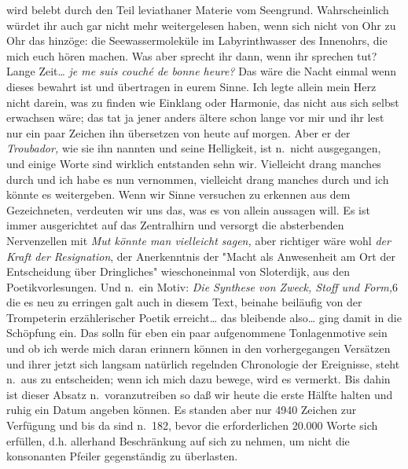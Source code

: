 \documentclass[
]{article}
\begin{document}
wird belebt durch den Teil leviathaner Materie vom Seengrund.
Wahrscheinlich würdet ihr auch gar nicht mehr weitergelesen haben, wenn
sich nicht von Ohr zu Ohr das hinzöge: die Seewassermoleküle im
Labyrinthwasser des Innenohrs, die mich euch hören machen. Was aber
sprecht ihr dann, wenn ihr sprechen tut? Lange Zeit\ldots{} \emph{je me
suis couché de bonne heure?} Das wäre die Nacht einmal wenn dieses
bewahrt ist und übertragen in eurem Sinne. Ich legte allein mein Herz
nicht darein, was zu finden wie Einklang oder Harmonie, das nicht aus
sich selbst erwachsen wäre; das tat ja jener anders ältere schon lange
vor mir und ihr lest nur ein paar Zeichen ihn übersetzen von heute auf
morgen. Aber er der \emph{Troubador, }wie sie ihn nannten und seine
Helligkeit, ist n.~nicht ausgegangen, und einige Worte sind wirklich
entstanden sehn wir. Vielleicht drang manches durch und ich habe es nun
vernommen, vielleicht drang manches durch und ich könnte es weitergeben.
Wenn wir Sinne versuchen zu erkennen aus dem Gezeichneten, verdeuten wir
uns das, was es von allein aussagen will. Es ist immer ausgerichtet auf
das Zentralhirn und versorgt die absterbenden Nervenzellen mit \emph{Mut
könnte man vielleicht sagen,} aber richtiger wäre wohl \emph{der Kraft
der Resignation}, der Anerkenntnis der "Macht als Anwesenheit am Ort der
Entscheidung über Dringliches" wieschoneinmal von Sloterdijk, aus den
Poetikvorlesungen. Und n.~ein Motiv: \emph{Die Synthese von Zweck, Stoff
und Form,}6 die es neu zu erringen galt auch in diesem Text, beinahe
beiläufig von der Trompeterin erzählerischer Poetik erreicht\ldots{} das
bleibende also\ldots{} ging damit in die Schöpfung ein. Das solln für
eben ein paar aufgenommene Tonlagenmotive sein und ob ich werde mich
daran erinnern können in den vorhergegangen Versätzen und ihrer jetzt
sich langsam natürlich regelnden Chronologie der Ereignisse, steht
n.~aus zu entscheiden; wenn ich mich dazu bewege, wird es vermerkt. Bis
dahin ist dieser Absatz n.~voranzutreiben so daß wir heute die erste
Hälfte halten und ruhig ein Datum angeben können. Es standen aber nur
4940 Zeichen zur Verfügung und bis da sind n.~182, bevor die
erforderlichen 20.000 Worte sich erfüllen, d.h. allerhand Beschränkung
auf sich zu nehmen, um nicht die konsonanten Pfeiler gegenständig zu
überlasten.
\end{document}
